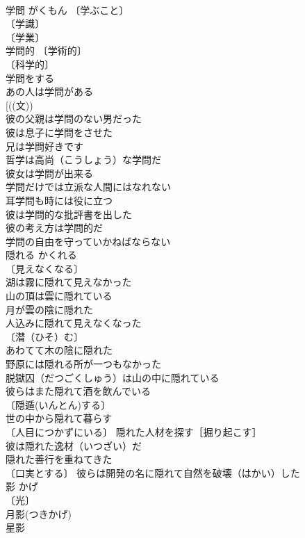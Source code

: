 \documentclass[8pt]{extreport}
\begin{document}
\begin{CJK}{UTF8}{min}
\\	学問	がくもん	〔学ぶこと〕
\\	〔学識〕
\\	〔学業〕
\\	学問的 〔学術的〕
\\	〔科学的〕
\\	学問をする 
\\	あの人は学問がある 
\\	[((文)) 
\\	彼の父親は学問のない男だった 
\\	彼は息子に学問をさせた 
\\	兄は学問好きです 
\\	哲学は高尚（こうしょう）な学問だ 
\\	彼女は学問が出来る 
\\	学問だけでは立派な人間にはなれない 
\\	耳学問も時には役に立つ 
\\	彼は学問的な批評書を出した 
\\	彼の考え方は学問的だ 
\\	学問の自由を守っていかねばならない 
\\	隠れる	かくれる	
\\	〔見えなくなる〕
\\	湖は霧に隠れて見えなかった 
\\	山の頂は雲に隠れている 
\\	月が雲の陰に隠れた 
\\	人込みに隠れて見えなくなった 
\\	〔潜（ひそ）む〕
\\	あわてて木の陰に隠れた 
\\	野原には隠れる所が一つもなかった 
\\	脱獄囚（だつごくしゅう）は山の中に隠れている 
\\	彼らはまた隠れて酒を飲んでいる 
\\	〔隠遁(いんとん)する〕　
\\	世の中から隠れて暮らす 
\\	〔人目につかずにいる〕 隠れた人材を探す［掘り起こす］ 
\\	彼は隠れた逸材（いつざい）だ 
\\	隠れた善行を重ねてきた 
\\	〔口実とする〕 彼らは開発の名に隠れて自然を破壊（はかい）した 
\\	影	かげ	
\\	〔光〕
\\	月影(つきかげ) 
\\	星影 

\end{CJK}
\end{document}
